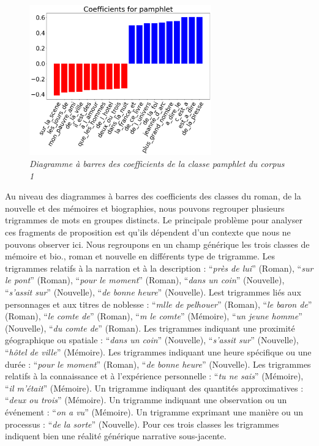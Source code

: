 \begin{figure}[H]
\centering %
\includegraphics[width=0.70\textwidth]{img/coefs-corpus1-pamphlet.png}
\caption{\textit{Diagramme à barres des coefficients de la classe pamphlet du corpus 1}}
\label{'fig:coefs-corpus1-pamphlet'}
\end{figure}

Au niveau des diagrammes à barres des coefficients des classes du roman, de la nouvelle et des mémoires et biographies, nous pouvons regrouper plusieurs trigrammes de mots en groupes distincts. Le principale problème pour analyser ces fragments de proposition est qu'ils dépendent d'un contexte que nous ne pouvons observer ici. Nous regroupons en un champ générique les trois classes de mémoire et bio., roman et nouvelle en différents type de trigramme. Les trigrammes relatifs à la narration et à la description :
\enquote{\textit{près de lui}} (Roman), \enquote{\textit{sur le pont}} (Roman), \enquote{\textit{pour le moment}} (Roman), \enquote{\textit{dans un coin}} (Nouvelle), \enquote{\textit{s'assit sur}} (Nouvelle), \enquote{\textit{de bonne heure}} (Nouvelle).
Lest trigrammes liés aux personnages et aux titres de noblesse :
\enquote{\textit{mlle de pelhouer}} (Roman), \enquote{\textit{le baron de}} (Roman), \enquote{\textit{le comte de}} (Roman), \enquote{\textit{m le comte}} (Mémoire), \enquote{\textit{un jeune homme}} (Nouvelle), \enquote{\textit{du comte de}} (Roman).
Les trigrammes indiquant une proximité géographique ou spatiale :
\enquote{\textit{dans un coin}} (Nouvelle), \enquote{\textit{s'assit sur}} (Nouvelle), \enquote{\textit{hôtel de ville}} (Mémoire).
Les trigrammes indiquant une heure spécifique ou une durée :
\enquote{\textit{pour le moment}} (Roman), \enquote{\textit{de bonne heure}} (Nouvelle).
Les trigrammes relatifs à la connaissance et à l'expérience personnelle :
\enquote{\textit{tu ne sais}} (Mémoire), \enquote{\textit{il m'était}} (Mémoire).
Un trigramme indiquant des quantités approximatives :
\enquote{\textit{deux ou trois}} (Mémoire).
Un trigramme indiquant une observation ou un événement :
\enquote{\textit{on a vu}} (Mémoire).
Un trigramme exprimant une manière ou un processus :
\enquote{\textit{de la sorte}} (Nouvelle). Pour ces trois classes les trigrammes indiquent bien une réalité générique narrative sous-jacente.

